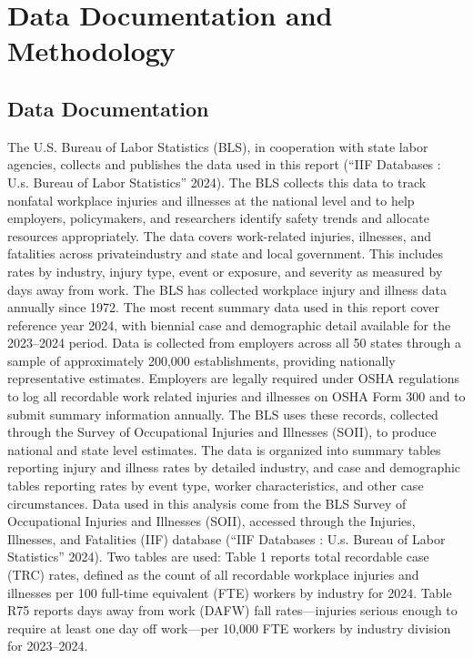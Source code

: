 \documentclass[
  letterpaper,
  DIV=11,
  numbers=noendperiod]{scrreprt}
\begin{document}
\cleardoublepage
{}
{}
\appendix

\chapter{Data Documentation and Methodology}\label{sec-data-doc}

\section{Data Documentation}\label{data-documentation-1}

The U.S. Bureau of Labor Statistics (BLS), in cooperation with state
labor agencies, collects and publishes the data used in this report
({``{IIF} Databases : U.s. Bureau of Labor Statistics''} 2024). The BLS
collects this data to track nonfatal workplace injuries and illnesses at
the national level and to help employers, policymakers, and researchers
identify safety trends and allocate resources appropriately. The data
covers work-related injuries, illnesses, and fatalities across
privateindustry and state and local government. This includes rates by
industry, injury type, event or exposure, and severity as measured by
days away from work. The BLS has collected workplace injury and illness
data annually since 1972. The most recent summary data used in this
report cover reference year 2024, with biennial case and demographic
detail available for the 2023--2024 period. Data is collected from
employers across all 50 states through a sample of approximately 200,000
establishments, providing nationally representative estimates. Employers
are legally required under OSHA regulations to log all recordable work
related injuries and illnesses on OSHA Form 300 and to submit summary
information annually. The BLS uses these records, collected through the
Survey of Occupational Injuries and Illnesses (SOII), to produce
national and state level estimates. The data is organized into summary
tables reporting injury and illness rates by detailed industry, and case
and demographic tables reporting rates by event type, worker
characteristics, and other case circumstances. Data used in this
analysis come from the BLS Survey of Occupational Injuries and Illnesses
(SOII), accessed through the Injuries, Illnesses, and Fatalities (IIF)
database ({``{IIF} Databases : U.s. Bureau of Labor Statistics''} 2024).
Two tables are used: Table 1 reports total recordable case (TRC) rates,
defined as the count of all recordable workplace injuries and illnesses
per 100 full-time equivalent (FTE) workers by industry for 2024. Table
R75 reports days away from work (DAFW) fall rates---injuries serious
enough to require at least one day off work---per 10,000 FTE workers by
industry division for 2023--2024.
\end{document}
